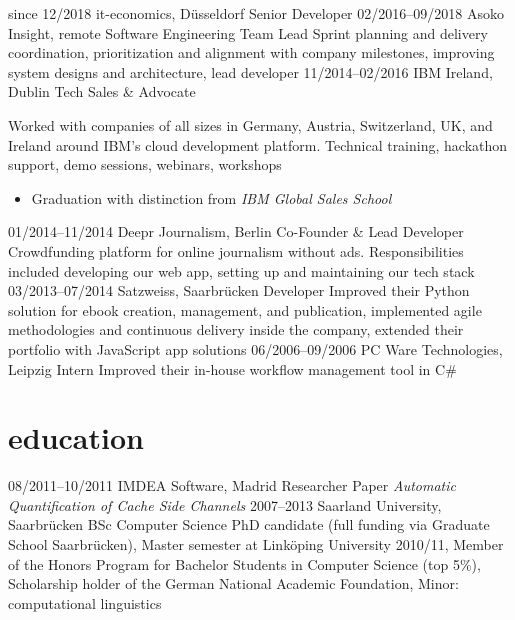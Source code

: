 \documentclass[a4paper]{cv}
\begin{document}
  \begin{entrylist}
    \entry
      {since 12/2018}
      {it-economics, Düsseldorf}
      {Senior Developer}
      {}
    \entry
      {02/2016--09/2018}
      {Asoko Insight, remote}
      {Software Engineering Team Lead}
      {Sprint planning and delivery coordination, prioritization and alignment with company milestones, improving system designs and architecture, lead developer}
    \entry
      {11/2014--02/2016}
      {IBM Ireland, Dublin}
      {Tech Sales \& Advocate}
      {Worked with companies of all sizes in Germany, Austria, Switzerland, UK, and Ireland around IBM’s cloud development platform. Technical training, hackathon support, demo sessions, webinars, workshops
        \begin{itemize}[leftmargin=0.3cm]
          \item Graduation with distinction from \emph{IBM Global Sales School}
        \end{itemize}
      }
    \entry
      {01/2014--11/2014}
      {Deepr Journalism, Berlin}
      {Co-Founder \& Lead Developer}
      {Crowdfunding platform for online journalism without ads. Responsibilities included developing our web app, setting up and maintaining our tech stack}
    \entry
      {03/2013--07/2014}
      {Satzweiss, Saarbrücken}
      {Developer}
      {Improved their Python solution for ebook creation, management, and publication, implemented agile methodologies and continuous delivery inside the company, extended their portfolio with JavaScript app solutions}
    \entry
      {06/2006--09/2006}
      {PC Ware Technologies, Leipzig}
      {Intern}
      {Improved their in-house workflow management tool in C\#}
  \end{entrylist}

  \section{education}

  \begin{entrylist}
    \entry
      {08/2011--10/2011}
      {IMDEA Software, Madrid}
      {Researcher}
      {Paper \emph{Automatic Quantification of Cache Side Channels}}
    \entry
      {2007--2013}
      {Saarland University, Saarbrücken}
      {BSc Computer Science}
      {PhD candidate (full funding via Graduate School Saarbrücken), Master semester at Linköping University 2010/11, Member of the Honors Program for Bachelor Students in Computer Science (top 5\%), Scholarship holder of the German National Academic Foundation, Minor: computational linguistics}
  \end{entrylist}
\end{document}
